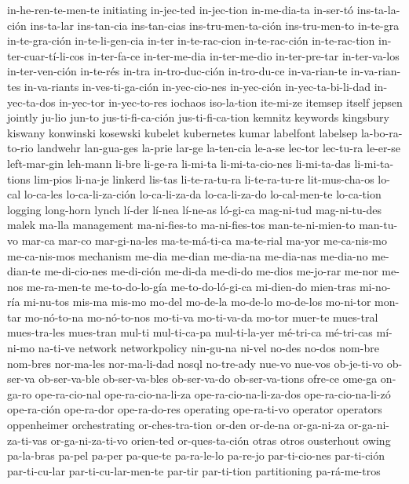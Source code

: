 {  in-he-ren-te-men-te initiating in-jec-ted in-jec-tion in-me-dia-ta
  in-ser-tó ins-ta-la-ción ins-ta-lar ins-tan-cia ins-tan-cias
  ins-tru-men-ta-ción ins-tru-men-to in-te-gra in-te-gra-ción
  in-te-li-gen-cia in-ter in-te-rac-cion in-te-rac-ción in-te-rac-tion
  in-ter-cuar-tí-li-cos in-ter-fa-ce in-ter-me-dia in-ter-me-dio
  in-ter-pre-tar in-ter-va-los in-ter-ven-ción in-te-rés in-tra
  in-tro-duc-ción in-tro-du-ce in-va-rian-te in-va-rian-tes
  in-va-riants in-ves-ti-ga-ción in-yec-cio-nes in-yec-ción
  in-yec-ta-bi-li-dad in-yec-ta-dos in-yec-tor in-yec-to-res iochaos
  iso-la-tion ite-mi-ze itemsep itself jepsen jointly ju-lio jun-to
  jus-ti-fi-ca-ción jus-ti-fi-ca-tion kemnitz keywords kingsbury
  kiswany konwinski kosewski kubelet kubernetes kumar labelfont
  labelsep la-bo-ra-to-rio landwehr lan-gua-ges la-prie lar-ge
  la-ten-cia le-a-se lec-tor lec-tu-ra le-er-se left-mar-gin leh-mann
  li-bre li-ge-ra li-mi-ta li-mi-ta-cio-nes li-mi-ta-das li-mi-ta-tions
  lim-pios li-na-je linkerd lis-tas li-te-ra-tu-ra li-te-ra-tu-re
  lit-mus-cha-os lo-cal lo-ca-les lo-ca-li-za-ción lo-ca-li-za-da
  lo-ca-li-za-do lo-cal-men-te lo-ca-tion logging long-horn lynch
  lí-der lí-nea lí-ne-as ló-gi-ca mag-ni-tud mag-ni-tu-des malek ma-lla
  management ma-ni-fies-to ma-ni-fies-tos man-te-ni-mien-to man-tu-vo
  mar-ca mar-co mar-gi-na-les ma-te-má-ti-ca ma-te-rial ma-yor
  me-ca-nis-mo me-ca-nis-mos mechanism me-dia me-dian me-dia-na
  me-dia-nas me-dia-no me-dian-te me-di-cio-nes me-di-ción me-di-da
  me-di-do me-dios me-jo-rar me-nor me-nos me-ra-men-te me-to-do-lo-gía
  me-to-do-ló-gi-ca mi-dien-do mien-tras mi-no-ría mi-nu-tos mis-ma
  mis-mo mo-del mo-de-la mo-de-lo mo-de-los mo-ni-tor mon-tar
  mo-nó-to-na mo-nó-to-nos mo-ti-va mo-ti-va-da mo-tor muer-te
  mues-tral mues-tra-les mues-tran mul-ti mul-ti-ca-pa mul-ti-la-yer
  mé-tri-ca mé-tri-cas mí-ni-mo na-ti-ve network networkpolicy
  nin-gu-na ni-vel no-des no-dos nom-bre nom-bres nor-ma-les
  nor-ma-li-dad nosql no-tre-ady nue-vo nue-vos ob-je-ti-vo ob-ser-va
  ob-ser-va-ble ob-ser-va-bles ob-ser-va-do ob-ser-va-tions ofre-ce
  ome-ga on-ga-ro ope-ra-cio-nal ope-ra-cio-na-li-za
  ope-ra-cio-na-li-za-dos ope-ra-cio-na-li-zó ope-ra-ción ope-ra-dor
  ope-ra-do-res operating ope-ra-ti-vo operator operators oppenheimer
  orchestrating or-ches-tra-tion or-den or-de-na or-ga-ni-za
  or-ga-ni-za-ti-vas or-ga-ni-za-ti-vo orien-ted or-ques-ta-ción otras
  otros ousterhout owing pa-la-bras pa-pel pa-per pa-que-te pa-ra-le-lo
  pa-re-jo par-ti-cio-nes par-ti-ción par-ti-cu-lar
  par-ti-cu-lar-men-te par-tir par-ti-tion partitioning pa-rá-me-tros
}
